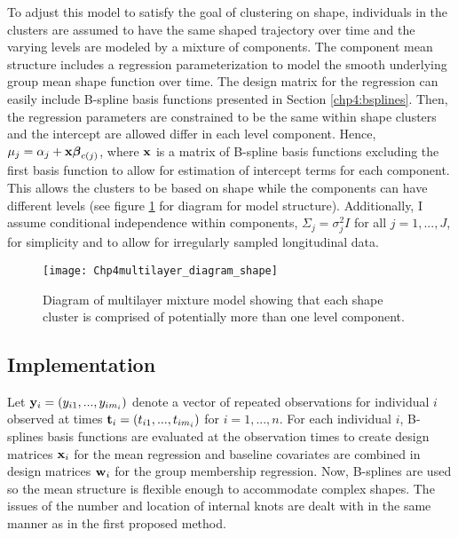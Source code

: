 To adjust this model to satisfy the goal of clustering on shape, individuals in the clusters are assumed to have the same shaped trajectory over time and the varying levels are modeled by a mixture of components. The component mean structure includes a regression parameterization to model the smooth underlying group mean shape function over time. The design matrix for the regression can easily include B-spline basis functions presented in Section \ref{chp4:bsplines}. Then, the regression parameters are constrained to be the same within shape clusters and the intercept are allowed differ in each level component. Hence, $\mu_{j}=\alpha_{j}+\mathbf x \boldsymbol\beta_{c(j)}$, where $\mathbf x$ is a matrix of B-spline basis functions excluding the first basis function to allow for estimation of intercept terms for each component. This allows the clusters to be based on shape while the components can have different levels (see figure \ref{fig:diashape} for diagram for model structure). Additionally, I assume conditional independence within components, $\Sigma_{j}=\sigma^{2}_{j}I$ for all $j=1,...,J$,  for simplicity and to allow for irregularly sampled longitudinal data.
\begin{figure}[h]
\begin{center}
\texttt{[image: Chp4multilayer\_diagram\_shape]}
\end{center}
\label{fig:diashape}
\caption{Diagram of multilayer mixture model showing that each shape cluster is comprised of potentially more than one level component.}
\end{figure}

\subsection{Implementation}
Let $\mathbf y_{i}=(y_{i1},...,y_{im_{i}})$ denote a vector of repeated observations for individual $i$ observed at times $\mathbf t_{i}=(t_{i1},...,t_{im_{i}})$  for $i=1,...,n$. For each individual $i$, B-splines basis functions are evaluated at the observation times to create design matrices $\mathbf x_{i}$ for the mean regression and baseline covariates are combined in design matrices $\mathbf w_{i}$ for the group membership regression. Now, B-splines are used so the mean structure is flexible enough to accommodate complex shapes. The issues of the number and location of internal knots are dealt with in the same manner as in the first proposed method.

